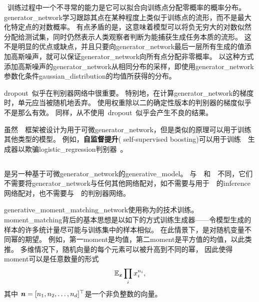 ~训练过程中一个不寻常的能力是它可以拟合向训练点分配零概率的概率分布。
\gls{generator_network}学习跟踪其点在某种程度上类似于训练点的流形，而不是最大化特定点的对数概率。
有点矛盾的是，这意味着模型可以将负无穷大的对数似然分配给测试集，同时仍然表示人类观察者判断为能捕获生成任务本质的流形。
这不是明显的优点或缺点，并且只要向\gls{generator_network}最后一层所有生成的值添加高斯噪声，就可以保证\gls{generator_network}向所有点分配非零概率。
以这种方式添加高斯噪声的\gls{generator_network}从相同分布的采样，即使用\gls{generator_network}参数化条件\gls{gaussian_distribution}的均值所获得的分布。


\gls{dropout}~似乎在判别器网络中很重要。
特别地，在计算\gls{generator_network}的梯度时，单元应当被随机地丢弃。
使用权重除以二的确定性版本的判别器的梯度似乎不是那么有效。
同样，从不使用~\gls{dropout}~似乎会产生不良的结果。


虽然~~框架被设计为用于可微\gls{generator_network}，但是类似的原理可以用于训练其他类型的模型。
例如，\textbf{自监督提升}( self-supervised boosting)可以用于训练~~生成器以欺骗\gls{logistic_regression}判别器~\citep{welling2002self}。


\subsection{}
\label{sec:generative_moment_matching_networks}

\citep{Li-et-al-2015,dziugaite2015training}是另一种基于可微\gls{generator_network}的\gls{generative_model}。
与~~和~~不同，它们不需要将\gls{generator_network}与任何其他网络配对，如不需要与用于~~的\gls{inference}网络配对，也不需要与~~的判别器网络。


\gls{generative_moment_matching_network}使用称为的技术训练。
\gls{moment_matching}背后的基本思想是以如下的方式训练生成器——令模型生成的样本的许多统计量尽可能与训练集中的样本相似。
在此情景下，是对随机变量不同幂的期望。
例如，第一\gls{moment}是均值，第二\gls{moment}是平方值的均值，以此类推。
多维情况下，随机向量的每个元素可以被升高到不同的幂， 因此使得\gls{moment}可以是任意数量的形式 %
\begin{align}
 \mathbb{E}_{\boldsymbol{\mathit{x}}} \prod_i x_i^{n_i},
\end{align}
其中 $\boldsymbol{\mathit{n}} = [n_1, n_2, \dots, n_d]^\top$是一个非负整数的向量。


